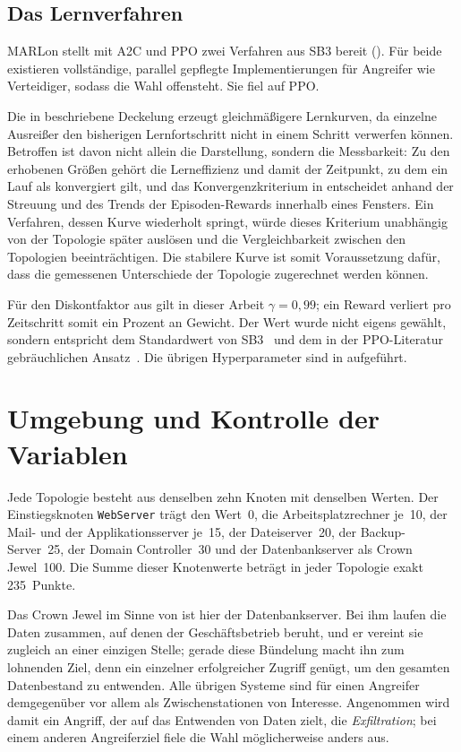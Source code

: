 \subsection{Das Lernverfahren}

MARLon stellt mit \ac{A2C} und \ac{PPO} zwei Verfahren aus \ac{SB3} bereit
(). Für beide existieren vollständige, parallel gepflegte
Implementierungen für Angreifer wie Verteidiger, sodass die Wahl offensteht.
Sie fiel auf \ac{PPO}.

Die in  beschriebene Deckelung erzeugt gleichmäßigere
Lernkurven, da einzelne Ausreißer den bisherigen Lernfortschritt nicht in einem
Schritt verwerfen können. Betroffen ist davon nicht allein die Darstellung,
sondern die Messbarkeit: Zu den erhobenen Größen gehört die Lerneffizienz und
damit der Zeitpunkt, zu dem ein Lauf als konvergiert gilt, und
das Konvergenzkriterium in  entscheidet anhand der
Streuung und des Trends der Episoden-Rewards innerhalb eines Fensters. Ein
Verfahren, dessen Kurve wiederholt springt, würde dieses Kriterium unabhängig
von der Topologie später auslösen und die Vergleichbarkeit zwischen den
Topologien beeinträchtigen. Die stabilere Kurve ist somit Voraussetzung dafür,
dass die gemessenen Unterschiede der Topologie zugerechnet werden können.

Für den Diskontfaktor aus  gilt in dieser Arbeit
$\gamma = 0{,}99$; ein Reward verliert pro Zeitschritt somit ein Prozent an
Gewicht. Der Wert wurde nicht eigens gewählt, sondern entspricht dem
Standardwert von \ac{SB3}~\cite{stablebaselines3} und dem in der
\ac{PPO}-Literatur gebräuchlichen Ansatz~\cite{schulman2017ppo}. Die übrigen
Hyperparameter sind in  aufgeführt.

\section{Umgebung und Kontrolle der Variablen}
\label{sec:umgebung}

Jede Topologie besteht aus denselben zehn Knoten mit denselben Werten. Der
Einstiegsknoten \texttt{WebServer} trägt den Wert~0, die Arbeitsplatzrechner
je~10, der Mail- und der Applikationsserver je~15, der Dateiserver~20, der
Backup-Server~25, der Domain Controller~30 und der Datenbankserver als Crown
Jewel~100. Die Summe dieser Knotenwerte beträgt in jeder Topologie exakt
235~Punkte.

Das Crown Jewel im Sinne von  ist hier der
Datenbankserver. Bei ihm laufen die Daten zusammen, auf denen der
Geschäftsbetrieb beruht, und er vereint sie zugleich an einer einzigen Stelle;
gerade diese Bündelung macht ihn zum lohnenden Ziel, denn ein einzelner
erfolgreicher Zugriff genügt, um den gesamten Datenbestand zu entwenden. Alle
übrigen Systeme sind für einen Angreifer demgegenüber vor allem als
Zwischenstationen von Interesse. Angenommen wird damit ein Angriff, der auf
das Entwenden von Daten zielt, die \emph{Exfiltration}; bei einem anderen
Angreiferziel fiele die Wahl möglicherweise anders aus.

